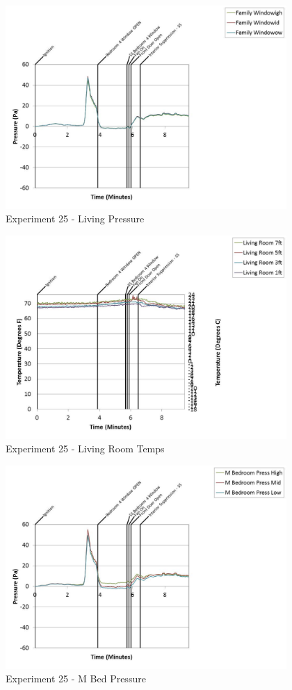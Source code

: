 \documentclass{article}
\begin{document}
\begin{appendices}
	\begin{figure}[h!]
		\centering
		\includegraphics[height=3.05in]{0_Images/Results_Charts/Exp_25_Charts/LivingPressure.pdf}
		\caption{Experiment 25 - Living Pressure}
	\end{figure}
 
	\clearpage

	\begin{figure}[h!]
		\centering
		\includegraphics[height=3.05in]{0_Images/Results_Charts/Exp_25_Charts/LivingRoomTemps.pdf}
		\caption{Experiment 25 - Living Room Temps}
	\end{figure}
 

	\begin{figure}[h!]
		\centering
		\includegraphics[height=3.05in]{0_Images/Results_Charts/Exp_25_Charts/MBedPressure.pdf}
		\caption{Experiment 25 - M Bed Pressure}
	\end{figure}
 

\end{appendices}
\end{document}

